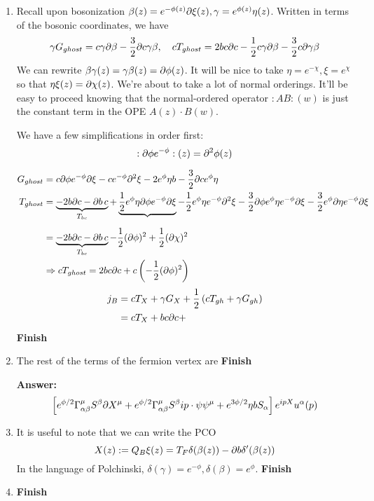 \documentclass[11pt, class=article, crop=false]{standalone}
\begin{document}
\begin{enumerate}
	\item Recall upon bosonization $\beta(z) = e^{-\phi(z)} \partial \xi(z), \gamma = e^{\phi(z)} \eta(z)$. Written in terms of the bosonic coordinates, we have
	\[
		\gamma G_{ghost} = c \gamma \partial \beta - \frac32 \partial c \gamma \beta, \quad c T_{ghost} = 2 b c \partial c - \frac12 c \gamma \partial \beta - \frac32 c \partial \gamma \beta
	\]
	We can rewrite $\beta \gamma(z) = \gamma \beta(z) = \partial \phi(z)$. It will be nice to take $\eta = e^{-\chi}, \xi = e^{\chi}$ so that $\eta \xi(z) = \partial \chi(z)$. We're about to take a lot of normal orderings. It'll be easy to proceed knowing that the normal-ordered operator $:AB:(w)$ is just the constant term in the OPE $A(z) \cdot B(w)$. 
	
	We have a few simplifications in order first:
	\[
		:\partial \phi e^{-\phi}:(z) = \partial^2 \phi(z)
	\]
	
	\[
	\begin{aligned}
		G_{ghost} &= c \partial \phi e^{-\phi} \partial\xi - c e^{-\phi} \partial^2 \xi - 2 e^{\phi} \eta b - \frac32 \partial c e^\phi \eta\\
	T_{ghost} &= \underbrace{-2 b \partial c - \partial b\, c}_{T_{bc}} + \underbrace{\frac12 e^{\phi} \eta \partial \phi e^{-\phi} \partial \xi}_{} - \frac12 e^{\phi} \eta e^{-\phi} \partial^2 \xi  - \frac32 \partial \phi e^\phi \eta e^{-\phi} \partial \xi - \frac32 e^\phi \partial \eta e^{-\phi} \partial \xi \\
	& = \underbrace{-2 b \partial c - \partial b\, c}_{T_{bc}} - \frac12 (\partial\phi)^2 + \frac12 (\partial \chi)^2
	\\& \Rightarrow c T_{ghost} = 2 b c \partial c + c \left(-\frac12 (\partial \phi)^2 \right)
	\end{aligned}
	\]
	\[
	\begin{aligned}
		j_B &= c T_X + \gamma G_X +  \frac12 \left(c T_{gh} + \gamma G_{gh} \right)\\
		&=  c T_X + b c \partial c + 
	\end{aligned}
	\]
	\textbf{Finish}
	\item The rest of the terms of the fermion vertex are \textbf{Finish}
	
	\textbf{Answer:}
	\[
		\left[e^{\phi/2} \Gamma_{\alpha \beta}^\mu S^\beta \partial X^\mu + e^{\phi/2} \Gamma_{\alpha \beta}^\mu S^\beta i p \cdot \psi \psi^\mu + e^{3 \phi/2} \eta b S_\alpha
		\right] e^{i p X} u^\alpha(p)
	\]
	\item It is useful to note that we can write the PCO
	\[
		X(z) := Q_B \xi (z) = T_F \delta(\beta(z)) - \partial b \delta'(\beta(z))
	\]
	In the language of Polchinski, $\delta(\gamma) = e^{-\phi}, \delta(\beta) = e^{\phi}$.  \textbf{Finish}
	\item \textbf{Finish}
	

\end{enumerate}
\end{document}
